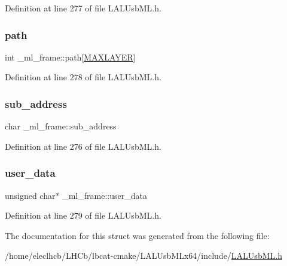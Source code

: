 Definition at line 277 of file L\+A\+L\+Usb\+M\+L.\+h.

\mbox{\label{struct__ml__frame_a16f43a5a0b9c1d56c2abeac26429ed54}} 
\subsubsection{\texorpdfstring{path}{path}}
{\footnotesize\ttfamily int \+\_\+ml\+\_\+frame\+::path\mbox{[}\hyperlink{LALUsbML_8h_acaee23bf97a6add491dd394ceb68cd1a}{M\+A\+X\+L\+A\+Y\+ER}\mbox{]}}



Definition at line 278 of file L\+A\+L\+Usb\+M\+L.\+h.

\mbox{\label{struct__ml__frame_a52d6a12345a0cc37bfc2d5c29e09d47b}} 
\subsubsection{\texorpdfstring{sub\+\_\+address}{sub\_address}}
{\footnotesize\ttfamily char \+\_\+ml\+\_\+frame\+::sub\+\_\+address}



Definition at line 276 of file L\+A\+L\+Usb\+M\+L.\+h.

\mbox{\label{struct__ml__frame_a0bf29f8a45b29b63e8593dcfb2a15ff6}} 
\subsubsection{\texorpdfstring{user\+\_\+data}{user\_data}}
{\footnotesize\ttfamily unsigned char$\ast$ \+\_\+ml\+\_\+frame\+::user\+\_\+data}



Definition at line 279 of file L\+A\+L\+Usb\+M\+L.\+h.



The documentation for this struct was generated from the following file\+:\begin{DoxyCompactItemize}
\item 
/home/eleclhcb/\+L\+H\+Cb/lbcat-\/cmake/\+L\+A\+L\+Usb\+M\+Lx64/include/\hyperlink{LALUsbML_8h}{L\+A\+L\+Usb\+M\+L.\+h}\end{DoxyCompactItemize}
